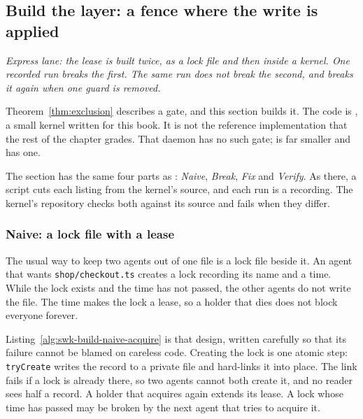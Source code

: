 %
\subsection{Build the layer: a fence where the write is applied}
\label{sec:swk-build}

\noindent\emph{Express lane: the lease is built twice, as a lock file and then
inside a kernel. One recorded run breaks the first. The same run does not break
the second, and breaks it again when one guard is removed.}

Theorem~\ref{thm:exclusion} describes a gate, and this section builds it. The
code is \pdkernelname{}, a small kernel written for this book. It is not the
reference implementation that the rest of the chapter grades. That daemon has
no such gate; \pdkernelname{} is far smaller and has one.

The section has the same four parts as :
\emph{Naive}, \emph{Break}, \emph{Fix} and \emph{Verify}. As there, a
script cuts each listing from the kernel's source, and each run is a
recording. The kernel's repository checks both against its source and fails
when they differ.

\subsubsection{Naive: a lock file with a lease}

The usual way to keep two agents out of one file is a lock file beside it. An
agent that wants \texttt{shop/checkout.ts} creates a lock recording its name
and a time. While the lock exists and the time has not passed, the other
agents do not write the file. The time makes the lock a lease, so a holder
that dies does not block everyone forever.

Listing~\ref{alg:swk-build-naive-acquire} is that design, written carefully so
that its failure cannot be blamed on careless code. Creating the lock is one
atomic step: \texttt{tryCreate} writes the record to a private file and
hard-links it into place. The link fails if a lock is already there, so two
agents cannot both create it, and no reader sees half a record. A holder that
acquires again extends its lease. A lock whose time has passed may be broken
by the next agent that tries to acquire it.

